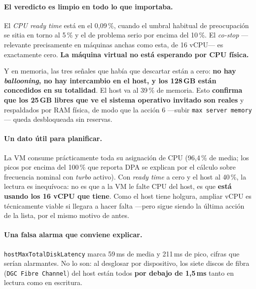 \documentclass[11pt,a4paper]{article}
\newcommand{\cod}[1]{\texttt{\small #1}}
\begin{document}
\paragraph{El veredicto es limpio en todo lo que importaba.} El
\emph{CPU ready time} está en el 0,09\,\%, cuando el umbral habitual de
preocupación se sitia en torno al 5\,\% y el de problema serio por encima del
10\,\%. El \emph{co-stop} —relevante precisamente en máquinas anchas como esta,
de 16 vCPU— es exactamente cero. \textbf{La máquina virtual no está esperando
por CPU física.}

Y en memoria, las tres señales que había que descartar están a cero:
\textbf{no hay \emph{ballooning}, no hay intercambio en el host, y los 128\,GB
están concedidos en su totalidad}. El host va al 39\,\% de memoria. Esto
\textbf{confirma que los 25\,GB libres que ve el sistema operativo invitado son
reales} y respaldados por RAM física, de modo que la acción 6 —subir
\cod{max server memory}— queda desbloqueada sin reservas.

\paragraph{Un dato útil para planificar.} La VM consume prácticamente toda su
asignación de CPU (96,4\,\% de media; los picos por encima del 100\,\% que
reporta DPA se explican por el cálculo sobre frecuencia nominal con
\emph{turbo} activo). Con \emph{ready time} a cero y el host al 40\,\%, la
lectura es inequívoca: no es que a la VM le falte CPU del host, es que
\textbf{está usando los 16 vCPU que tiene}. Como el host tiene holgura, ampliar
vCPU es técnicamente viable si llegara a hacer falta —pero sigue siendo la
última acción de la lista, por el mismo motivo de antes.

\paragraph{Una falsa alarma que conviene explicar.}
\cod{hostMaxTotalDiskLatency} marca 59\,ms de media y 211\,ms de pico, cifras
que serían alarmantes. No lo son: al desglosar por dispositivo, los siete
discos de fibra (\cod{DGC Fibre Channel}) del host están todos
\textbf{por debajo de 1,5\,ms} tanto en lectura como en escritura.
\end{document}
